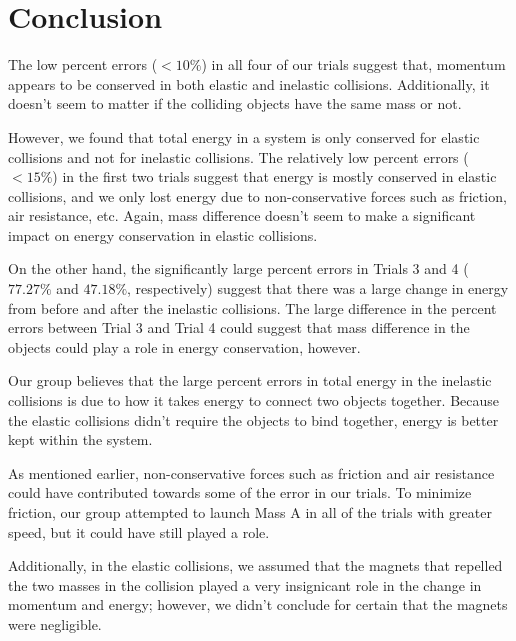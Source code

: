 \documentclass[fleqn]{article}
\begin{document}
\section*{Conclusion}
The low percent errors ($<10\%$) in all four of our trials suggest that, momentum appears to be conserved in both elastic and inelastic collisions.  Additionally, it doesn't seem to matter if the colliding objects have the same mass or not.

However, we found that total energy in a system is only conserved for elastic collisions and not for inelastic collisions. The relatively low percent errors ($<15\%$) in the first two trials suggest that energy is mostly conserved in elastic collisions, and we only lost energy due to non-conservative forces such as friction, air resistance, etc. Again, mass difference doesn't seem to make a significant impact on energy conservation in elastic collisions.

On the other hand, the significantly large percent errors in Trials 3 and 4 ($77.27\%$ and $47.18\%$, respectively) suggest that there was a large change in energy from before and after the inelastic collisions. The large difference in the percent errors between Trial 3 and Trial 4 could suggest that mass difference in the objects could play a role in energy conservation, however.

Our group believes that the large percent errors in total energy in the inelastic collisions is due to how it takes energy to connect two objects together. Because the elastic collisions didn't require the objects to bind together, energy is better kept within the system.

As mentioned earlier, non-conservative forces such as friction and air resistance could have contributed towards some of the error in our trials. To minimize friction, our group attempted to launch Mass A in all of the trials with greater speed, but it could have still played a role.

Additionally, in the elastic collisions, we assumed that the magnets that repelled the two masses in the collision played a very insignicant role in the change in momentum and energy; however, we didn't conclude for certain that the magnets were negligible.
\end{document}
